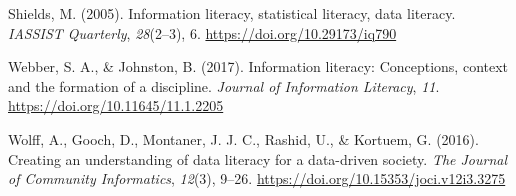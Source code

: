 \documentclass[
  12pt,
  a4paper,
  twoside]{article}
\newlength{\cslhangindent}
\newenvironment{CSLReferences}[2] %
 {\begin{list}{}{%
  \setlength{\itemindent}{0pt}
  \setlength{\leftmargin}{0pt}
  \setlength{\parsep}{0pt}
  \ifodd #1
   \setlength{\leftmargin}{\cslhangindent}
   \setlength{\itemindent}{-1\cslhangindent}
  \fi
  \setlength{\itemsep}{#2\baselineskip}}}
 {\end{list}}
\begin{document}
\begin{CSLReferences}{1}{0}
Shields, M. (2005). Information literacy, statistical literacy, data
literacy. \emph{IASSIST Quarterly}, \emph{28}(2--3), 6.
\url{https://doi.org/10.29173/iq790}

Webber, S. A., \& Johnston, B. (2017). Information literacy:
Conceptions, context and the formation of a discipline. \emph{Journal of
Information Literacy}, \emph{11}.
\url{https://doi.org/10.11645/11.1.2205}

Wolff, A., Gooch, D., Montaner, J. J. C., Rashid, U., \& Kortuem, G.
(2016). Creating an understanding of data literacy for a data-driven
society. \emph{The Journal of Community Informatics}, \emph{12}(3),
9--26. \url{https://doi.org/10.15353/joci.v12i3.3275}

\end{CSLReferences}
\end{document}
